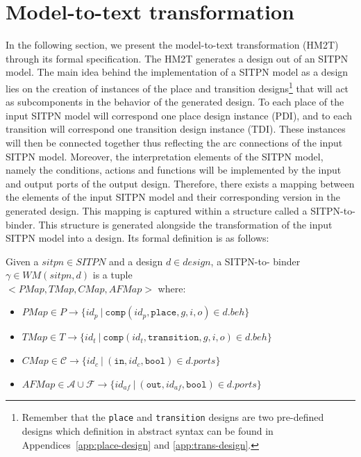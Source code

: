 \section{Model-to-text transformation}
\label{sec:m2t}

In the following section, we present the \hilecop{} model-to-text
transformation (HM2T) through its formal specification.  The HM2T
generates a \hvhdl{} design out of an SITPN model.  The main idea
behind the implementation of a SITPN model as a \hvhdl{} design lies
on the creation of instances of the place and transition
designs\footnote{Remember that the \texttt{place} and
  \texttt{transition} designs are two pre-defined designs which
  definition in abstract syntax can be found in
  Appendices~\ref{app:place-design} and \ref{app:trans-design}.} that
will act as subcomponents in the behavior of the generated design. To
each place of the input SITPN model will correspond one place design
instance (PDI), and to each transition will correspond one transition
design instance (TDI). These instances will then be connected together
thus reflecting the arc connections of the input SITPN
model. Moreover, the interpretation elements of the SITPN model,
namely the conditions, actions and functions will be implemented by
the input and output ports of the output design. Therefore, there
exists a mapping between the elements of the input SITPN model and
their corresponding version in the generated \hvhdl{} design. This
mapping is captured within a structure called a SITPN-to-\hvhdl{}
binder.  This structure is generated alongside the transformation of
the input SITPN model into a \hvhdl{} design. Its formal definition is
as follows:
\begin{definition}
  \label{def:sitpn-to-hvhdl-binder}
  Given a $sitpn\in{}SITPN$ and a \hvhdl{} design $d\in{}design$, a
  SITPN-to-\hvhdl{} binder $\gamma\in{}WM(sitpn,d)$ is a tuple\\
  ${<}PMap,TMap,CMap,AFMap{>}$ where:
  \begin{itemize}
  \item $PMap\in{}P\rightarrow{}\{id_p~|~\mathtt{comp}(id_p,\mathtt{place},g,i,o)\in{}d.beh\}$
  \item $TMap\in{}T\rightarrow{}\{id_t~|~\mathtt{comp}(id_t,\mathtt{transition},g,i,o)\in{}d.beh\}$
  \item $CMap\in\mathcal{C}\rightarrow\{id_c~|~(\mathtt{in}, id_c, \mathtt{bool})\in{}d.ports\}$
  \item $AFMap\in\mathcal{A}\cup\mathcal{F}\rightarrow\{id_{af}~|~(\mathtt{out}, id_{af}, \mathtt{bool})\in{}d.ports\}$
  \end{itemize}
\end{definition}

